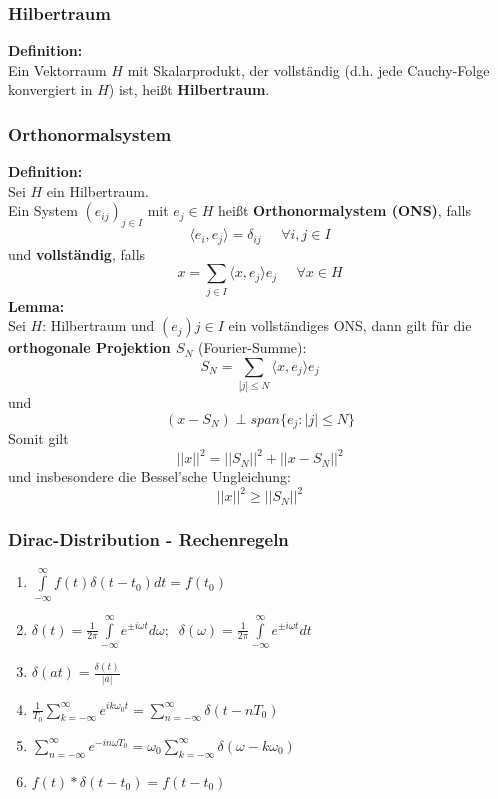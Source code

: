 \documentclass[a4paper,twocolumn,10pt]{article}
\begin{document}
\subsubsection{Hilbertraum}
\textbf{Definition:}\\
Ein Vektorraum $H$ mit Skalarprodukt, der vollständig (d.h. jede Cauchy-Folge konvergiert in $H$) ist, heißt \textbf{Hilbertraum}.

\subsubsection{Orthonormalsystem}
\textbf{Definition:}\\
Sei $H$ ein Hilbertraum.\\
Ein System $(e_{ij})_{j\in I}$ mit $e_j\in H$ heißt \textbf{Orthonormalystem (ONS)}, falls
\begin{equation*}
\langle e_i,e_j\rangle =\delta_{ij}\;\;\;\;\;\forall i,j\in I
\end{equation*}
und \textbf{vollständig}, falls
\begin{equation*}
x=\sum\limits_{j\in I}\langle x,e_j\rangle e_j\;\;\;\;\;\forall x\in H
\end{equation*}
\textbf{Lemma:}\\
Sei $H$: Hilbertraum und $(e_j){j\in I}$ ein vollständiges ONS, dann gilt für die \textbf{orthogonale Projektion $S_N$} (Fourier-Summe):
\begin{equation*}
S_N=\sum\limits_{|j|\leq N}\langle x,e_j\rangle e_j
\end{equation*}
und
\begin{equation*}
(x-S_N)\perp span\{e_j:|j|\leq N\}
\end{equation*}
Somit gilt
\begin{equation*}
||x||^2=||S_N||^2+||x-S_N||^2
\end{equation*}
und insbesondere die Bessel'sche Ungleichung:
\begin{equation*}
||x||^2\geq ||S_N||^2
\end{equation*}

\subsubsection{Dirac-Distribution - Rechenregeln}
\begin{enumerate}[label=$\bullet$]
\item $\int\limits_{-\infty}^{\infty}f(t)\delta (t-t_0)dt=f(t_0)$
\item $\delta (t)=\frac{1}{2\pi}\int\limits_{-\infty}^{\infty}e^{\pm i\omega t}d\omega;\;\;\delta (\omega)=\frac{1}{2\pi}\int\limits_{-\infty}^{\infty}e^{\pm i\omega t}dt$
\item $\delta(at)=\frac{\delta (t)}{|a|}$
\item $\frac{1}{T_0}\sum\limits_{k=-\infty}^{\infty}e^{ik\omega_0 t}=\sum\limits_{n=-\infty}^{\infty}\delta(t-nT_0)$
\item $\sum\limits_{n=-\infty}^{\infty}e^{-in\omega T_0}=\omega_0\sum\limits_{k=-\infty}^{\infty}\delta(\omega-k\omega_0)$
\item $f(t)*\delta(t-t_0)=f(t-t_0)$
\end{enumerate}
\end{document}
